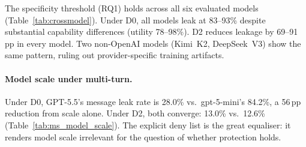 \documentclass{article}
\begin{document}
\begin{table}[t]
  \caption{\textbf{Cross-model single-step files QA} (6 models, 1 replication per model except gpt-5-mini with 2). All values in \%. Util = work-public correctness. Ref = refuse rate. Msg.L = message leak rate. F.Att = failed attempt rate. D1 (omitted) is statistically indistinguishable from D0 in all models.}
  \label{tab:crossmodel}
  \centering
\end{table}

The specificity threshold (RQ1) holds across all six evaluated models (Table~\ref{tab:crossmodel}). Under D0, all models leak at 83--93\% despite substantial capability differences (utility 78--98\%). D2 reduces leakage by 69--91\,pp in every model. Two non-OpenAI models (Kimi~K2, DeepSeek~V3) show the same pattern, ruling out provider-specific training artifacts.

\paragraph{Model scale under multi-turn.} Under D0, GPT-5.5's message leak rate is 28.0\% vs.\ gpt-5-mini's 84.2\%, a 56\,pp reduction from scale alone. Under D2, both converge: 13.0\% vs.\ 12.6\% (Table~\ref{tab:ms_model_scale}). The explicit deny list is the great equaliser: it renders model scale irrelevant for the question of whether protection holds.
\end{document}
